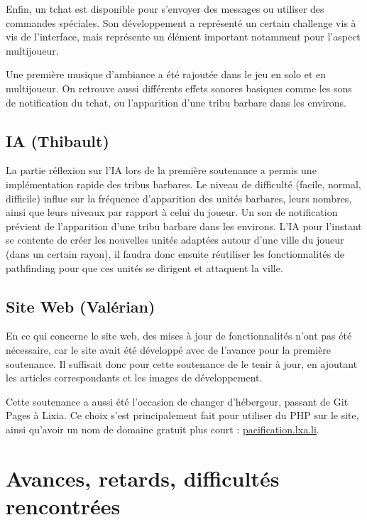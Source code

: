 \documentclass[12pt]{report}
\begin{document}
Enfin, un tchat est disponible pour s'envoyer des messages ou utiliser des
commandes spéciales. Son développement a représenté un certain challenge vis à
vis de l'interface, mais représente un élément important notamment pour
l'aspect multijoueur.

Une première musique d'ambiance a été rajoutée dans le jeu en solo et en
multijoueur. On retrouve aussi différents effets sonores basiques comme les
sons de notification du tchat, ou l'apparition d'une tribu barbare dans les
environs.

\newpage

\section{IA (Thibault)}

La partie réflexion sur l'IA lors de la première soutenance a permis une
implémentation rapide des tribus barbares. Le niveau de difficulté (facile,
normal, difficile) influe sur la fréquence d'apparition des unités barbares,
leurs nombres, ainsi que leurs niveaux par rapport à celui du joueur. Un son de
notification prévient de l'apparition d'une tribu barbare dans les environs.
L'IA pour l'instant se contente de créer les nouvelles unités adaptées autour
d'une ville du joueur (dans un certain rayon), il faudra donc ensuite réutiliser
les fonctionnalités de pathfinding pour que ces unités se dirigent et attaquent
la ville.

\section{Site Web (Valérian)}

En ce qui concerne le site web, des mises à jour de fonctionnalités n’ont pas
été nécessaire, car le site avait été développé avec de l’avance pour la
première soutenance. Il suffisait donc pour cette soutenance de le tenir à
jour, en ajoutant les articles correspondants et les images de développement.

Cette soutenance a aussi été l’occasion de changer d'hébergeur, passant de Git
Pages à Lixia. Ce choix s’est principalement fait pour utiliser du PHP sur le
site, ainsi qu'avoir un nom de domaine gratuit plus court :
\url{pacification.lxa.li}.

\chapter{Avances, retards, difficultés rencontrées}
\end{document}
